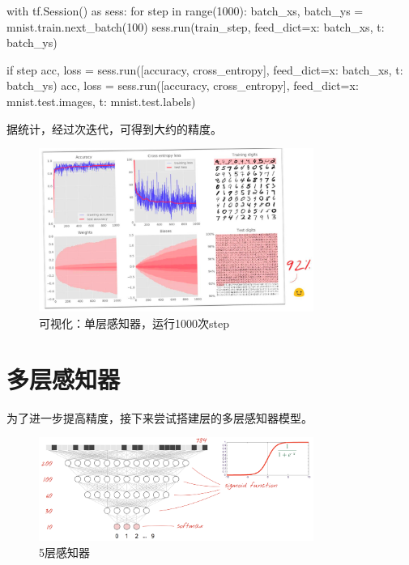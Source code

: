\begin{content}
\begin{content}
\begin{leftbar}
\begin{python}
with tf.Session() as sess:
  for step in range(1000):
    batch_xs, batch_ys = mnist.train.next_batch(100)        
    sess.run(train_step, feed_dict={x: batch_xs, t: batch_ys})
    
    if step %
      acc, loss = sess.run([accuracy, cross_entropy], 
        feed_dict={x: batch_xs, t: batch_ys})
      acc, loss = sess.run([accuracy, cross_entropy], 
        feed_dict={x: mnist.test.images, t: mnist.test.labels}) 
\end{python}
\end{leftbar}

据统计，经过次迭代，可得到大约的精度。

\begin{figure}[H]
\centering
\includegraphics[width=0.8\textwidth]{figures/mnist-slp-accuracy.png}
\caption{可视化：单层感知器，运行1000次step}
 \label{fig:mnist-slp-accuracy}
\end{figure}

\end{content}

\section{多层感知器}

\begin{content}

为了进一步提高精度，接下来尝试搭建层的多层感知器模型。

\begin{figure}[H]
\centering
\includegraphics[width=0.8\textwidth]{figures/mnist-5-layer.png}
\caption{5层感知器}
 \label{fig:mnist-5-layer}
\end{figure}


\end{content}
\end{content}
